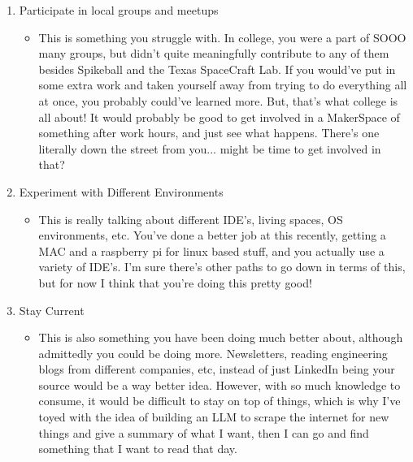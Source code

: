 \documentclass{article}
\begin{document}
\begin{enumerate}
\begin{itemize}
        \end{itemize}
    \item Participate in local groups and meetups
        \begin{itemize}
            \item This is something you struggle with. In college, you were a part of SOOO many groups, but didn't quite meaningfully contribute to any of them besides Spikeball and the Texas SpaceCraft Lab. If you would've put in some extra work and taken yourself away from trying to do everything all at once, you probably could've learned more. But, that's what college is all about! It would probably be good to get involved in a MakerSpace of something after work hours, and just see what happens. There's one literally down the street from you... might be time to get involved in that?
        \end{itemize}
    \item Experiment with Different Environments
        \begin{itemize}
            \item This is really talking about different IDE's, living spaces, OS environments, etc. You've done a better job at this recently, getting a MAC and a raspberry pi for linux based stuff, and you actually use a variety of IDE's. I'm sure there's other paths to go down in terms of this, but for now I think that you're doing this pretty good!
        \end{itemize}
    \item Stay Current
        \begin{itemize}
            \item This is also something you have been doing much better about, although admittedly you could be doing more. Newsletters, reading engineering blogs from different companies, etc, instead of just LinkedIn being your source would be a way better idea. However, with so much knowledge to consume, it would be difficult to stay on top of things, which is why I've toyed with the idea of building an LLM to scrape the internet for new things and give a summary of what I want, then I can go and find something that I want to read that day.
        \end{itemize}
\end{enumerate}
\end{document}
